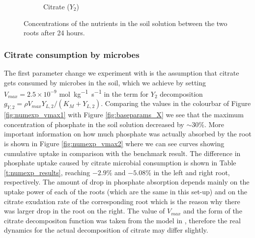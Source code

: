\documentclass[11pt]{article}
\numberwithin{equation}{section}
\begin{document}
\begin{figure}[!htb]
\begin{subfigure}[t]{0.3\textwidth}
    \caption{Citrate ($Y_2$)}
    \label{fig:baseparams_Y2}
\end{subfigure}
\caption{Concentrations of the nutrients in the soil solution between the two roots after 24 hours.}
\label{fig:baseparams}
\end{figure}

\subsubsection{Citrate consumption by microbes}
\label{sec:numexp_vmax}
The first parameter change we experiment with is the assumption that citrate gets consumed by microbes in the soil, which we achieve by setting $V_{max} = 2.5 \times 10^{-9}$ \si{mol.kg^{-1}.s^{-1}} in the term for $Y_2$ decomposition $g_{Y,2} = \rho V_{max} Y_{L,2}/(K_M+Y_{L,2})$. Comparing the values in the colourbar of Figure \ref{fig:numexp_vmax1} with Figure \ref{fig:baseparams_X} we see that the maximum concentration of phosphate in the soil solution decreased by $\sim 30\%$. More important information on how much phosphate was actually absorbed by the root is shown in Figure \ref{fig:numexp_vmax2} where we can see curves showing cumulative uptake in comparison with the benchmark result. The difference in phosphate uptake caused by citrate microbial consumption is shown in Table \ref{t:numexp_results}, reaching $-2.9\%$ and $-5.08\%$ in the left and right root, respectively. The amount of drop in phosphate absorption depends mainly on the uptake power of each of the roots (which are the same in this set-up) and on the citrate exudation rate of the corresponding root which is the reason why there was larger drop in the root on the right. The value of $V_{max}$ and the form of the citrate decompositon function was taken from the  model in \cite{Ptashnyk-2011}, therefore the real dynamics for the actual decomposition of citrate may differ slightly.
\end{document}
